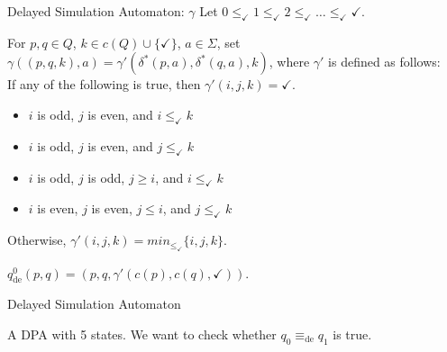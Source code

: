 \begin{frame}{Delayed Simulation Automaton: $\gamma$}
	Let $0 \leq_\checkmark 1 \leq_\checkmark 2 \leq_\checkmark \dots \leq_\checkmark \checkmark$.

	For $p, q \in Q$, $k \in c(Q) \cup \{\checkmark\}$, $a \in \Sigma$, set $\gamma((p, q, k), a) = \gamma'(\delta^*(p, a), \delta^*(q, a), k)$, where $\gamma'$ is defined as follows: \\
	If any of the following is true, then $\gamma'(i, j, k) = \checkmark$.
	
	\begin{itemize}
		\item $i$ is odd, $j$ is even, and $i \leq_\checkmark k$
		\item $i$ is odd, $j$ is even, and $j \leq_\checkmark k$
		\item $i$ is odd, $j$ is odd, $j \geq i$, and $i \leq_\checkmark k$
		\item $i$ is even, $j$ is even, $j \leq i$, and $j \leq_\checkmark k$
	\end{itemize}
	
	Otherwise, $\gamma'(i, j, k) = min_{\leq_\checkmark} \{ i,j,k \}$.
	
	$q_\text{de}^0(p, q) = (p, q, \gamma'(c(p), c(q), \checkmark))$.
\end{frame}


\begin{frame}{Delayed Simulation Automaton}
\begin{figure}
\centering
{}
\label{fig:examples:desim1}
\end{figure}

A DPA with 5 states. We want to check whether $q_0 \equiv_\text{de} q_1$ is true. 
\end{frame}

